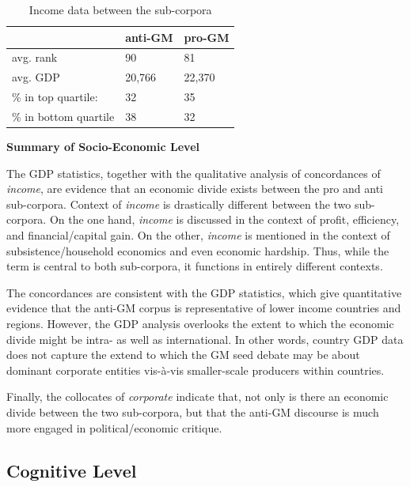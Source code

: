 \begin{table}[H]
\begin{footnotesize}
\centering
\begin{tabular}{|l|l|l|}
\hline
\textbf{}            & \textbf{anti-GM} & \textbf{pro-GM} \\\hline
avg. rank            & 90                      & 81                     \\\hline
avg. GDP             & 20,766                  & 22,370                 \\\hline
\% in top quartile:   & 32                      & 35                     \\\hline
\% in bottom quartile & 38                      & 32                    \\\hline
\end{tabular}
\caption{Income data between the sub-corpora}
\label{tab:table1}
\end{footnotesize}
\end{table}


\textbf{Summary of Socio-Economic Level} 

The GDP statistics, together with the qualitative analysis of concordances of \textit{income}, are evidence that an economic divide exists between the pro and anti sub-corpora. Context of \textit{income} is drastically different between the two sub-corpora. On the one hand, \textit{income} is discussed in the context of profit, efficiency, and financial/capital gain. On the other, \textit{income} is mentioned in the context of subsistence/household economics and even economic hardship. Thus, while the term is central to both sub-corpora, it functions in entirely different contexts. 

The concordances are consistent with the GDP statistics, which give quantitative evidence that the anti-GM corpus is representative of lower income countries and regions. However, the GDP analysis overlooks the extent to which the economic divide might be intra- as well as international. In other words, country GDP data does not capture the extend to which the GM seed debate may be about dominant corporate entities vis-\`a-vis smaller-scale producers within countries.

Finally, the collocates of \textit{corporate} indicate that, not only is there an economic divide between the two sub-corpora, but that the anti-GM discourse is much more engaged in political/economic critique. 


\subsection{Cognitive Level}

